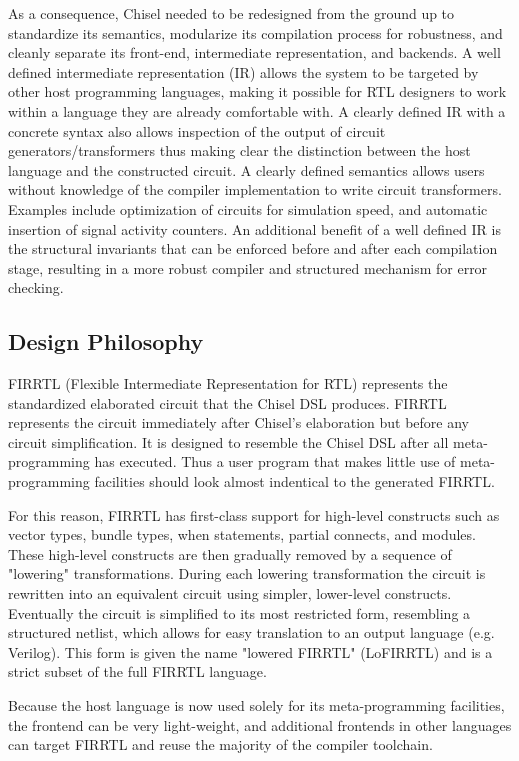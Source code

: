 \documentclass[12pt]{article}
\begin{document}
As a consequence, Chisel needed to be redesigned from the ground up to standardize its semantics, modularize its compilation process for robustness, and cleanly separate its front-end, intermediate representation, and backends. A well defined intermediate representation (IR) allows the system to be targeted by other host programming languages, making it possible for RTL designers to work within a language they are already comfortable with. A clearly defined IR with a concrete syntax also allows inspection of the output of circuit generators/transformers thus making clear the distinction between the host language and the constructed circuit. A clearly defined semantics allows users without knowledge of the compiler implementation to write circuit transformers. Examples include optimization of circuits for simulation speed, and automatic insertion of signal activity counters. An additional benefit of a well defined IR is the structural invariants that can be enforced before and after each compilation stage, resulting in a more robust compiler and structured mechanism for error checking. 

\subsection{Design Philosophy}
FIRRTL (Flexible Intermediate Representation for RTL) represents the standardized elaborated circuit that the Chisel DSL produces. FIRRTL represents the circuit immediately after Chisel's elaboration but before any circuit simplification. It is designed to resemble the Chisel DSL after all meta-programming has executed. Thus a user program that makes little use of meta-programming facilities should look almost indentical to the generated FIRRTL.

For this reason, FIRRTL has first-class support for high-level constructs such as vector types, bundle types, when statements, partial connects, and modules. These high-level constructs are then gradually removed by a sequence of "lowering" transformations. During each lowering transformation the circuit is rewritten into an equivalent circuit using simpler, lower-level constructs. Eventually the circuit is simplified to its most restricted form, resembling a structured netlist, which allows for easy translation to an output language (e.g. Verilog). This form is given the name "lowered FIRRTL" (LoFIRRTL) and is a strict subset of the full FIRRTL language.

Because the host language is now used solely for its meta-programming facilities, the frontend can be very light-weight, and additional frontends in other languages can target FIRRTL and reuse the majority of the compiler toolchain.
\end{document}
